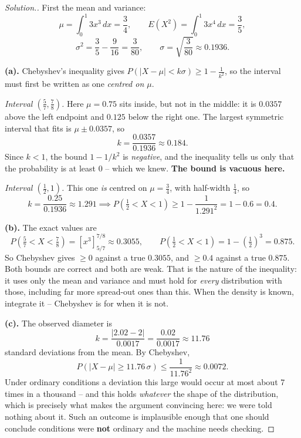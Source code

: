 \documentclass[12pt,a4paper]{report}
\theoremstyle{definition}
\theoremstyle{plain}
\theoremstyle{definition}
\newenvironment{solution}
  {\renewcommand{\qedsymbol}{}\begin{proof}[\textit{Solution}.]}
  {\end{proof}}
\begin{document}
\begin{solution}
First the mean and variance:
\[\mu = \int_0^{1}3x^{3}\,dx = \frac{3}{4},\qquad
E(X^{2}) = \int_0^{1}3x^{4}\,dx = \frac{3}{5},\]
\[\sigma^{2} = \frac{3}{5}-\frac{9}{16} = \frac{3}{80},\qquad
\sigma = \sqrt{\frac{3}{80}} \approx 0.1936.\]

\textbf{(a).} Chebyshev's inequality gives
$P(|X-\mu|<k\sigma) \geq 1-\frac{1}{k^{2}}$, so the interval must first be written as one
\emph{centred on $\mu$}.

\emph{Interval $\left(\frac57,\frac78\right)$.} Here $\mu = 0.75$ sits inside, but not in
the middle: it is $0.0357$ above the left endpoint and $0.125$ below the right one. The
largest symmetric interval that fits is $\mu\pm 0.0357$, so
\[k = \frac{0.0357}{0.1936} \approx 0.184.\]
Since $k<1$, the bound $1-1/k^{2}$ is \emph{negative}, and the inequality tells us only
that the probability is at least $0$ -- which we knew. \textbf{The bound is vacuous here.}

\emph{Interval $\left(\frac12,1\right)$.} This one \emph{is} centred on $\mu = \tfrac34$,
with half-width $\tfrac14$, so
\[k = \frac{0.25}{0.1936} \approx 1.291
 \implies P\left(\tfrac12<X<1\right) \geq 1-\frac{1}{1.291^{2}} = 1-0.6 = 0.4.\]

\textbf{(b).} The exact values are
\[P\left(\tfrac57<X<\tfrac78\right) = \left[x^{3}\right]_{5/7}^{7/8} \approx 0.3055,
\qquad
P\left(\tfrac12<X<1\right) = 1-\left(\tfrac12\right)^{3} = 0.875.\]
So Chebyshev gives $\geq 0$ against a true $0.3055$, and $\geq 0.4$ against a true
$0.875$. Both bounds are correct and both are weak. That is the nature of the inequality:
it uses only the mean and variance and must hold for \emph{every} distribution with
those, including far more spread-out ones than this. When the density is known, integrate
it -- Chebyshev is for when it is not.

\textbf{(c).} The observed diameter is
\[k = \frac{|2.02-2|}{0.0017} = \frac{0.02}{0.0017} \approx 11.76\]
standard deviations from the mean. By Chebyshev,
\[P\left(|X-\mu| \geq 11.76\,\sigma\right) \leq \frac{1}{11.76^{2}} \approx 0.0072.\]
Under ordinary conditions a deviation this large would occur at most about 7 times in a
thousand -- and this holds \emph{whatever} the shape of the distribution, which is
precisely what makes the argument convincing here: we were told nothing about it. Such an
outcome is implausible enough that one should conclude conditions were \textbf{not}
ordinary and the machine needs checking.
\end{solution}
\end{document}
